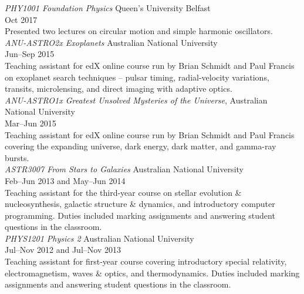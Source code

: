 \documentclass[11pt]{res} %
\begin{document}
\begin{resume}
  {\it PHY1001 Foundation Physics} \hfill Queen's University Belfast\\
  \null\hfill Oct 2017\\
  Presented two lectures on circular motion and simple harmonic oscillators.\\

  {\it ANU-ASTRO2x Exoplanets} \hfill Australian National University\\
  \null\hfill Jun--Sep 2015\\
  Teaching assistant for edX online course run by Brian Schmidt and Paul Francis on exoplanet search techniques -- pulsar timing, radial-velocity variations, transits, microlensing, and direct imaging with adaptive optics.\\

  {\it ANU-ASTRO1x Greatest Unsolved Mysteries of the Universe}, \hfill Australian National University\\
  \null\hfill Mar--Jun 2015\\
  Teaching assistant for edX online course run by Brian Schmidt and Paul Francis covering the expanding universe, dark energy, dark matter, and gamma-ray bursts.\\

  {\it ASTR3007 From Stars to Galaxies} \hfill Australian National University\\
  \null\hfill Feb--Jun 2013 and May--Jun 2014\\
  Teaching assistant for the third-year course on stellar evolution \& nucleosynthesis, galactic structure \& dynamics, and introductory computer programming. Duties included marking assignments and answering student questions in the classroom.\\

  {\it PHYS1201 Physics 2} \hfill Australian National University\\
  \null\hfill Jul--Nov 2012 and Jul--Nov 2013\\
  Teaching assistant for first-year course covering introductory special relativity, electromagnetism, waves \& optics, and thermodynamics. Duties included marking assignments and answering student questions in the classroom.

\begin{comment}
\section{Referees}
  \textbf{Dr. Stuart Sim}\\
  Lecturer, Centre for Astrophysics Research\\
  Queen's University Belfast, UK\\
  stuart.sim@anu.edu.au


\end{comment}
\end{resume}
\end{document}

